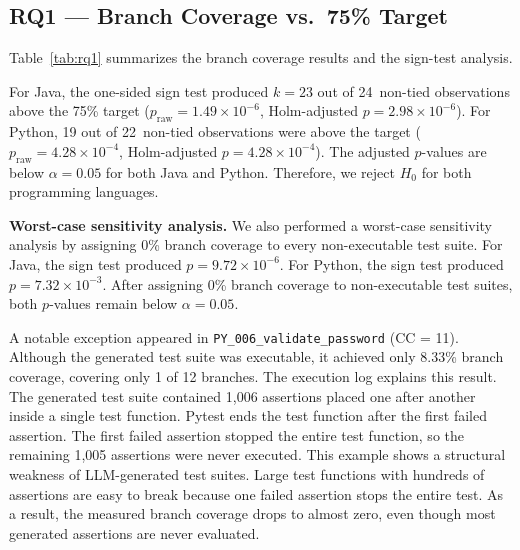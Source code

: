 \documentclass[conference]{IEEEtran}
\begin{document}
\subsection{RQ1 --- Branch Coverage vs.\ 75\% Target}
\label{subsec:rq1}

Table~\ref{tab:rq1} summarizes the branch coverage results and the sign-test analysis.

\begin{table}[htbp]
\centering
\caption{RQ1: Branch Coverage Results (Primary Complete-Case Analysis)}
\label{tab:rq1}
\end{table}

For Java, the one-sided sign test produced $k = 23$ out of 24~non-tied observations above the 75\% target ($p_{\text{raw}} = 1.49 \times 10^{-6}$, Holm-adjusted $p = 2.98 \times 10^{-6}$).
For Python, 19 out of 22~non-tied observations were above the target ($p_{\text{raw}} = 4.28 \times 10^{-4}$, Holm-adjusted $p = 4.28 \times 10^{-4}$).
The adjusted $p$-values are below $\alpha = 0.05$ for both Java and Python. Therefore, we reject $H_0$ for both programming languages.

\textbf{Worst-case sensitivity analysis.}
We also performed a worst-case sensitivity analysis by assigning 0\% branch coverage to every non-executable test suite.
For Java, the sign test produced $p = 9.72 \times 10^{-6}$.
For Python, the sign test produced $p = 7.32 \times 10^{-3}$.
After assigning 0\% branch coverage to non-executable test suites, both $p$-values remain below $\alpha = 0.05$.

A notable exception appeared in \texttt{PY\_006\_validate\_password} (CC = 11).
Although the generated test suite was executable, it achieved only 8.33\% branch coverage, covering only 1 of 12 branches.
The execution log explains this result. The generated test suite contained 1,006 assertions placed one after another inside a single test function. Pytest ends the test function after the first failed assertion. The first failed assertion stopped the entire test function, so the remaining 1,005 assertions were never executed.
This example shows a structural weakness of LLM-generated test suites. Large test functions with hundreds of assertions are easy to break because one failed assertion stops the entire test. As a result, the measured branch coverage drops to almost zero, even though most generated assertions are never evaluated.
\end{document}
